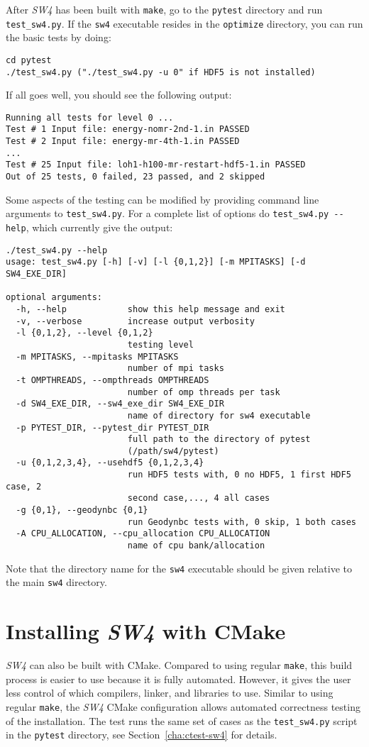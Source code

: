 \documentclass[11pt]{article}
\begin{document}
After \emph{SW4} has been built with \verb+make+, go to the \verb+pytest+ directory and run
\verb+test_sw4.py+. If the \verb+sw4+ executable resides in the \verb+optimize+ directory, you can
run the basic tests by doing:
\begin{verbatim}
cd pytest
./test_sw4.py ("./test_sw4.py -u 0" if HDF5 is not installed)
\end{verbatim}
If all goes well, you should see the following output:
\begin{verbatim}
Running all tests for level 0 ...
Test # 1 Input file: energy-nomr-2nd-1.in PASSED
Test # 2 Input file: energy-mr-4th-1.in PASSED
...
Test # 25 Input file: loh1-h100-mr-restart-hdf5-1.in PASSED
Out of 25 tests, 0 failed, 23 passed, and 2 skipped
\end{verbatim}
Some aspects of the testing can be modified by providing command line arguments to
\verb+test_sw4.py+. For a complete list of options do \verb+test_sw4.py --help+, which currently
give the output:
\begin{verbatim}
./test_sw4.py --help
usage: test_sw4.py [-h] [-v] [-l {0,1,2}] [-m MPITASKS] [-d SW4_EXE_DIR]

optional arguments:
  -h, --help            show this help message and exit
  -v, --verbose         increase output verbosity
  -l {0,1,2}, --level {0,1,2}
                        testing level
  -m MPITASKS, --mpitasks MPITASKS
                        number of mpi tasks
  -t OMPTHREADS, --ompthreads OMPTHREADS
                        number of omp threads per task
  -d SW4_EXE_DIR, --sw4_exe_dir SW4_EXE_DIR
                        name of directory for sw4 executable
  -p PYTEST_DIR, --pytest_dir PYTEST_DIR
                        full path to the directory of pytest
                        (/path/sw4/pytest)
  -u {0,1,2,3,4}, --usehdf5 {0,1,2,3,4}
                        run HDF5 tests with, 0 no HDF5, 1 first HDF5 case, 2
                        second case,..., 4 all cases
  -g {0,1}, --geodynbc {0,1}
                        run Geodynbc tests with, 0 skip, 1 both cases
  -A CPU_ALLOCATION, --cpu_allocation CPU_ALLOCATION
                        name of cpu bank/allocation
\end{verbatim}
Note  that the directory name for the \verb+sw4+ executable should be given relative to the main
\verb+sw4+ directory.

\section{Installing \emph{SW4} with CMake}\label{cha:installing-cmake-sw4}
\emph{SW4} can also be built with CMake. Compared to using regular {\tt make}, this build process is
easier to use because it is fully automated. However, it gives the user less control of which
compilers, linker, and libraries to use. Similar to using regular {\tt make}, the \emph{SW4} CMake
configuration allows automated correctness testing of the installation. The test runs the same set
of cases as the \verb+test_sw4.py+ script in the \verb+pytest+ directory, see
Section~\ref{cha:ctest-sw4} for details.
\end{document}
